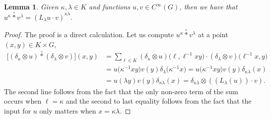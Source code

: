 \documentclass[10pt,a4paper]{amsart}
\numberwithin{equation}{section}
\newtheorem{Lemma}[Theorem]{Lemma}
\theoremstyle{definition}
\newcommand{\starcirc}{\overset{\circ}{*}}
\newcommand{\inv}{^{-1}}
\begin{document}
\begin{Lemma}\label{lemma:compute.star.circ}
  Given $ \kappa, \lambda \in K $ and functions $ u, v \in C^\infty(G) $, then we have that
  $u^\kappa \starcirc v^\lambda = ( L_{\lambda} u \cdot v )^{\kappa \lambda}$.
\end{Lemma}
\begin{proof}
The proof is a direct calculation. Let us compute $ u^\kappa \starcirc v^\lambda $ at a point $ (x,y ) \in K \times G $,
\begin{align*}
  \big[ (\delta_{\kappa} \otimes u ) \starcirc (\delta_{\lambda} \otimes v ) \big] (x,y) &=
  \sum_{\ell \in K } ( \delta_\kappa \otimes u) \big(\ell, \ell\inv x y\big) \cdot (\delta_{\lambda} \otimes v )\big(\ell\inv x, y\big) \\
  &= u\big(\kappa\inv x y \big) v(y) \delta_{\lambda}\big(\kappa\inv x\big) = u\big(\kappa\inv x y \big) v(y) \delta_{\kappa \lambda}(x) \\
  &= u(\lambda y ) v(y) \delta_{\kappa \lambda}(x)
  = \delta_{\kappa \lambda} \otimes (( L_{\lambda}(u)) \cdot v).
\end{align*}
The second line follows from the fact that the only non-zero term of the sum occurs when $ \ell = \kappa $ and the second to last equality follows from the fact that the input for $ u $ only matters when $ x = \kappa \lambda $.
\end{proof}
\end{document}
